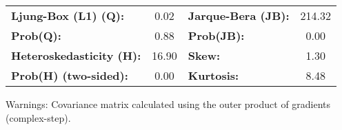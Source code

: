 \documentclass{article}%
\begin{document}
\begin{center}
\begin{tabular}{lcccccc}
\bottomrule
\end{tabular}
\begin{tabular}{lclc}
\textbf{Ljung-Box (L1) (Q):}     &  0.02 & \textbf{  Jarque-Bera (JB):  } & 214.32  \\
\textbf{Prob(Q):}                &  0.88 & \textbf{  Prob(JB):          } &  0.00   \\
\textbf{Heteroskedasticity (H):} & 16.90 & \textbf{  Skew:              } &  1.30   \\
\textbf{Prob(H) (two-sided):}    &  0.00 & \textbf{  Kurtosis:          } &  8.48   \\
\bottomrule
\end{tabular}
\end{center}

Warnings: \newline
 [1] Covariance matrix calculated using the outer product of gradients (complex-step).%
\end{document}
